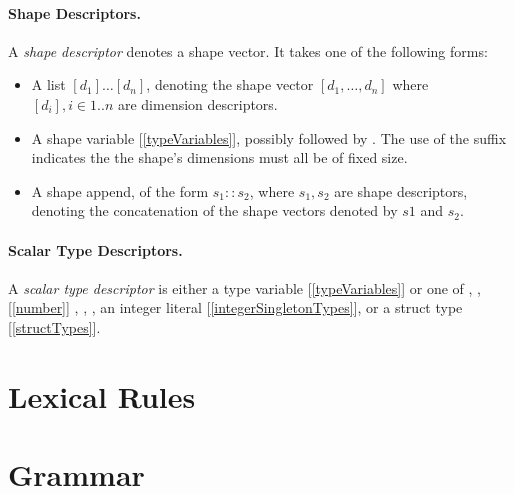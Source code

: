 \documentclass{article}
\begin{document}
\paragraph{Shape Descriptors.}
 A {\em shape descriptor} denotes a shape vector. It takes one of the following forms:
 \begin{itemize}
 \item  A list $[d_1] \ldots [d_n]$, denoting the shape vector $[d_1, \ldots, d_n]$ where $[d_i], i \in 1..n$ are dimension descriptors.
 \item A shape variable [\ref{typeVariables}], possibly followed by \BANG. The use of the \BANG{} suffix indicates the the shape's  dimensions must all be of fixed size. 
 \item A shape append, of the form $s_1 :: s_2$, where $s_1, s_2$ are shape descriptors, denoting the concatenation of the shape vectors denoted by $s1$ and $s_2$. 
 \end{itemize}
 
\paragraph{Scalar Type Descriptors.}
 A {\em scalar type descriptor} is either a type variable [\ref{typeVariables}] or one of \BOOL [\ref{bool}],  \NUM,[\ref{number}] \INT, \FLOAT, \STRING [\ref{string}], an integer literal [\ref{integerSingletonTypes}], or a struct type [\ref{structTypes}].


\section{Lexical Rules}
\label{lexicalRules}
\printlexitable

\section{Grammar}
\label{grammar}
\printgrammartable
\end{document}
